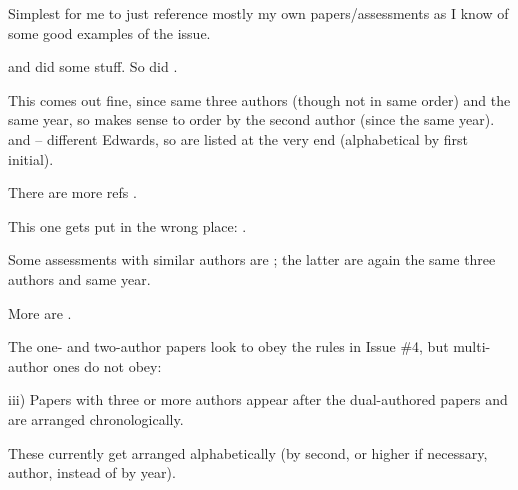 \documentclass[11pt]{book}
\newcommand{\fishname}{Pacific Ocean Perch}
\begin{document}

Simplest for me to just reference mostly my own papers/assessments as I know of
some good examples of the issue.

\citet{eb96} and \citet{eb99} did some stuff. So did \citet{eb01}. 

This comes out fine, since same three authors (though not in same order) 
and the same year, so makes sense to order by the second author (since the same 
year).
\citet{ebp00} and \citet{epb00} -- different Edwards, so are listed at the very 
end (alphabetical by first initial).

There are more refs \citep{edwa01, edwa08, efbj12}.

This one gets put in the wrong place: \citet{ez90}.

Some assessments with similar authors are 
\citet{ehs12, ehs14area5DE, ehs14area3CD}; the latter are again the same three 
authors and same year.

More are \citet{ehs15, epw01, esh12, erpbb17}.

The one- and two-author papers look to obey the rules in Issue \#4, but 
multi-author ones do not obey:

iii) Papers with three or more authors appear after the dual-authored papers 
and are arranged chronologically. 

These currently get arranged alphabetically (by second, or higher if necessary, 
author, instead of by year).

\clearpage



\end{document}
